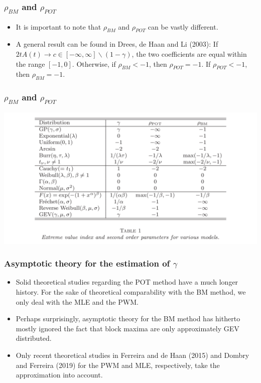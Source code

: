 \documentclass{beamer}
\begin{document}
\begin{frame}
    \frametitle{$\rho_{BM}$ and $\rho_{POT}$}
    \begin{itemize}
        \item It is important to note that $\rho_{BM}$ and $\rho_{POT}$ can be vastly different. 
        \item A general result can be found in Drees, de Haan and Li (2003): If $2tA(t)\to c \in [-\infty,\infty]\backslash(1-\gamma)$, the two coefficients are equal within the range $[-1,0]$. Otherwise, if $\rho_{BM}<-1$, then $\rho_{POT}=-1$. If $\rho_{POT}<-1$, then $\rho_{BM}=-1$.
    \end{itemize}
    

    

\end{frame}

\begin{frame}
    \frametitle{$\rho_{BM}$ and $\rho_{POT}$}

    \includegraphics[width=1\textwidth]{fig1.png}

\end{frame}

\begin{frame}
    \frametitle{Asymptotic theory for the estimation of $\gamma$}
\begin{itemize}
    \item Solid theoretical studies regarding the POT method have a much longer history. For the sake of theoretical comparability with the BM
    method, we only deal with the MLE and the PWM.
    \item Perhaps surprisingly, asymptotic theory for the BM method has hitherto mostly ignored the fact that
    block maxima are only {\color{red} approximately} GEV distributed.
    \item Only recent theoretical studies in Ferreira and de Haan (2015) and Dombry and Ferreira (2019) for the PWM and MLE, respectively,
    take the approximation into account.
\end{itemize}
\end{frame}
\end{document}
